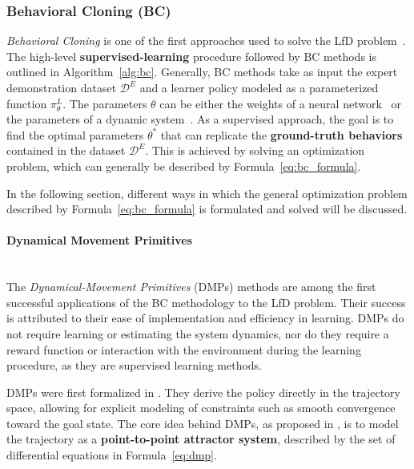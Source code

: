 \subsubsection{Behavioral Cloning (BC)}
\label{sec:bc}

\textit{Behavioral Cloning} is one of the first approaches used to solve the LfD problem~\cite{pomerleau1988alvinn}. The high-level \textbf{supervised-learning} procedure followed by BC methods is outlined in Algorithm~\ref{alg:bc}. Generally, BC methods take as input the expert demonstration dataset $\mathcal{D}^{E}$ and a learner policy modeled as a parameterized function $\pi_{\theta}^{L}$. The parameters $\theta$ can be either the weights of a neural network~\cite{pomerleau1988alvinn} or the parameters of a dynamic system~\cite{ijspeert2002learning}. As a supervised approach, the goal is to find the optimal parameters $\theta^{*}$ that can replicate the \textbf{ground-truth behaviors} contained in the dataset $\mathcal{D}^{E}$. This is achieved by solving an optimization problem, which can generally be described by Formula~\ref{eq:bc_formula}.


In the following section, different ways in which the general optimization problem described by Formula~\ref{eq:bc_formula} is formulated and solved will be discussed.

\paragraph*{Dynamical Movement Primitives}\mbox{}\\
The \textit{Dynamical-Movement Primitives} (DMPs) methods are among the first successful applications of the BC methodology to the LfD problem. Their success is attributed to their ease of implementation and efficiency in learning. DMPs do not require learning or estimating the system dynamics, nor do they require a reward function or interaction with the environment during the learning procedure, as they are supervised learning methods.

DMPs were first formalized in \cite{ijspeert2002learning}. They derive the policy directly in the trajectory space, allowing for explicit modeling of constraints such as smooth convergence toward the goal state. The core idea behind DMPs, as proposed in \cite{ijspeert2002learning,ijspeert2013dynamical}, is to model the trajectory as a \textbf{point-to-point attractor system}, described by the set of differential equations in Formula~\ref{eq:dmp}.



